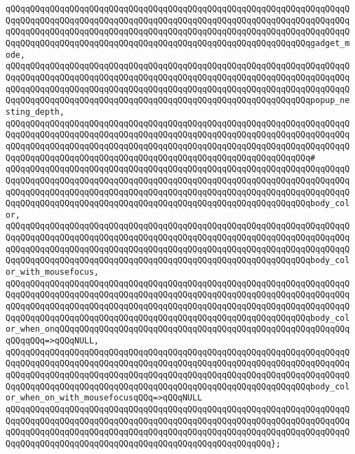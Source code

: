 \verb|qQQqqQQqqQQqqQQqqQQqqQQqqQQqqQQqqQQqqQQqqQQqqQQqqQQqqQQqqQQqqQQqqQQqqQQqqQQqqQQqqQQqqQQqqQQqqQQqqQQqqQQqqQQqqQQqqQQqqQQqqQQqqQQqqQQqqQQqqQQqqQQqqQQqqQQqqQQqqQQqqQQqqQQqqQQqqQQqqQQqqQQqqQQqqQQqqQQqqQQqqQQqqQQqqQQqqQQqqQQqqQQqqQQqqQQqqQQqqQQqqQQqqQQqqQQqqQQqqQQqqQQqqQQqqQQqgadget_mode,|\newline
\verb|qQQqqQQqqQQqqQQqqQQqqQQqqQQqqQQqqQQqqQQqqQQqqQQqqQQqqQQqqQQqqQQqqQQqqQQqqQQqqQQqqQQqqQQqqQQqqQQqqQQqqQQqqQQqqQQqqQQqqQQqqQQqqQQqqQQqqQQqqQQqqQQqqQQqqQQqqQQqqQQqqQQqqQQqqQQqqQQqqQQqqQQqqQQqqQQqqQQqqQQqqQQqqQQqqQQqqQQqqQQqqQQqqQQqqQQqqQQqqQQqqQQqqQQqqQQqqQQqqQQqqQQqqQQqqQQqpopup_nesting_depth,|\newline
\verb|qQQqqQQqqQQqqQQqqQQqqQQqqQQqqQQqqQQqqQQqqQQqqQQqqQQqqQQqqQQqqQQqqQQqqQQqqQQqqQQqqQQqqQQqqQQqqQQqqQQqqQQqqQQqqQQqqQQqqQQqqQQqqQQqqQQqqQQqqQQqqQQqqQQqqQQqqQQqqQQqqQQqqQQqqQQqqQQqqQQqqQQqqQQqqQQqqQQqqQQqqQQqqQQqqQQqqQQqqQQqqQQqqQQqqQQqqQQqqQQqqQQqqQQqqQQqqQQqqQQqqQQqqQQqqQQq#|\newline
\verb|qQQqqQQqqQQqqQQqqQQqqQQqqQQqqQQqqQQqqQQqqQQqqQQqqQQqqQQqqQQqqQQqqQQqqQQqqQQqqQQqqQQqqQQqqQQqqQQqqQQqqQQqqQQqqQQqqQQqqQQqqQQqqQQqqQQqqQQqqQQqqQQqqQQqqQQqqQQqqQQqqQQqqQQqqQQqqQQqqQQqqQQqqQQqqQQqqQQqqQQqqQQqqQQqqQQqqQQqqQQqqQQqqQQqqQQqqQQqqQQqqQQqqQQqqQQqqQQqqQQqqQQqqQQqqQQqbody_color,|\newline
\verb|qQQqqQQqqQQqqQQqqQQqqQQqqQQqqQQqqQQqqQQqqQQqqQQqqQQqqQQqqQQqqQQqqQQqqQQqqQQqqQQqqQQqqQQqqQQqqQQqqQQqqQQqqQQqqQQqqQQqqQQqqQQqqQQqqQQqqQQqqQQqqQQqqQQqqQQqqQQqqQQqqQQqqQQqqQQqqQQqqQQqqQQqqQQqqQQqqQQqqQQqqQQqqQQqqQQqqQQqqQQqqQQqqQQqqQQqqQQqqQQqqQQqqQQqqQQqqQQqqQQqqQQqqQQqqQQqbody_color_with_mousefocus,|\newline
\verb|qQQqqQQqqQQqqQQqqQQqqQQqqQQqqQQqqQQqqQQqqQQqqQQqqQQqqQQqqQQqqQQqqQQqqQQqqQQqqQQqqQQqqQQqqQQqqQQqqQQqqQQqqQQqqQQqqQQqqQQqqQQqqQQqqQQqqQQqqQQqqQQqqQQqqQQqqQQqqQQqqQQqqQQqqQQqqQQqqQQqqQQqqQQqqQQqqQQqqQQqqQQqqQQqqQQqqQQqqQQqqQQqqQQqqQQqqQQqqQQqqQQqqQQqqQQqqQQqqQQqqQQqqQQqqQQqbody_color_when_onqQQqqQQqqQQqqQQqqQQqqQQqqQQqqQQqqQQqqQQqqQQqqQQqqQQqqQQqqQQqqQQqqQQq=>qQQqNULL,|\newline
\verb|qQQqqQQqqQQqqQQqqQQqqQQqqQQqqQQqqQQqqQQqqQQqqQQqqQQqqQQqqQQqqQQqqQQqqQQqqQQqqQQqqQQqqQQqqQQqqQQqqQQqqQQqqQQqqQQqqQQqqQQqqQQqqQQqqQQqqQQqqQQqqQQqqQQqqQQqqQQqqQQqqQQqqQQqqQQqqQQqqQQqqQQqqQQqqQQqqQQqqQQqqQQqqQQqqQQqqQQqqQQqqQQqqQQqqQQqqQQqqQQqqQQqqQQqqQQqqQQqqQQqqQQqqQQqqQQqbody_color_when_on_with_mousefocusqQQq=>qQQqNULL|\newline
\verb|qQQqqQQqqQQqqQQqqQQqqQQqqQQqqQQqqQQqqQQqqQQqqQQqqQQqqQQqqQQqqQQqqQQqqQQqqQQqqQQqqQQqqQQqqQQqqQQqqQQqqQQqqQQqqQQqqQQqqQQqqQQqqQQqqQQqqQQqqQQqqQQqqQQqqQQqqQQqqQQqqQQqqQQqqQQqqQQqqQQqqQQqqQQqqQQqqQQqqQQqqQQqqQQqqQQqqQQqqQQqqQQqqQQqqQQqqQQqqQQqqQQqqQQqqQQqqQQqqQQqqQQq};|\newline
